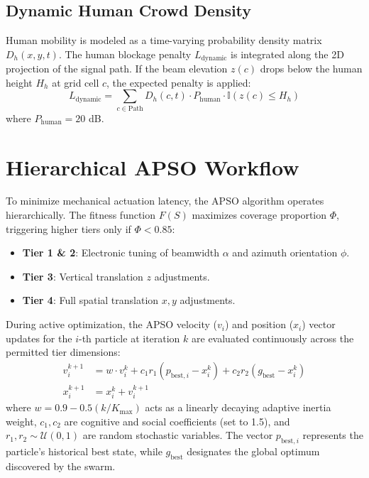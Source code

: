 \documentclass[10pt, a4paper]{article}
\begin{document}
\subsection{Dynamic Human Crowd Density}
Human mobility is modeled as a time-varying probability density matrix $D_h(x,y,t)$. The human blockage penalty $L_{\text{dynamic}}$ is integrated along the 2D projection of the signal path. If the beam elevation $z(c)$ drops below the human height $H_h$ at grid cell $c$, the expected penalty is applied:
\begin{equation}
    L_{\text{dynamic}} = \sum_{c \in \text{Path}} D_h(c, t) \cdot P_{\text{human}} \cdot \mathbb{I}(z(c) \leq H_h)
\end{equation}
where $P_{\text{human}} = 20$ dB.

\section{Hierarchical APSO Workflow}
To minimize mechanical actuation latency, the APSO algorithm operates hierarchically. The fitness function $F(S)$ maximizes coverage proportion $\Phi$, triggering higher tiers only if $\Phi < 0.85$:
\begin{itemize}
    \item \textbf{Tier 1 \& 2}: Electronic tuning of beamwidth $\alpha$ and azimuth orientation $\phi$.
    \item \textbf{Tier 3}: Vertical translation $z$ adjustments.
    \item \textbf{Tier 4}: Full spatial translation $x, y$ adjustments.
\end{itemize}

During active optimization, the APSO velocity ($v_i$) and position ($x_i$) vector updates for the $i$-th particle at iteration $k$ are evaluated continuously across the permitted tier dimensions:
\begin{align}
    v_i^{k+1} &= w \cdot v_i^k + c_1 r_1 (p_{\text{best},i} - x_i^k) + c_2 r_2 (g_{\text{best}} - x_i^k) \\
    x_i^{k+1} &= x_i^k + v_i^{k+1}
\end{align}
where $w = 0.9 - 0.5 (k / K_{\max})$ acts as a linearly decaying adaptive inertia weight, $c_1, c_2$ are cognitive and social coefficients (set to 1.5), and $r_1, r_2 \sim \mathcal{U}(0, 1)$ are random stochastic variables. The vector $p_{\text{best},i}$ represents the particle's historical best state, while $g_{\text{best}}$ designates the global optimum discovered by the swarm.
\end{document}
